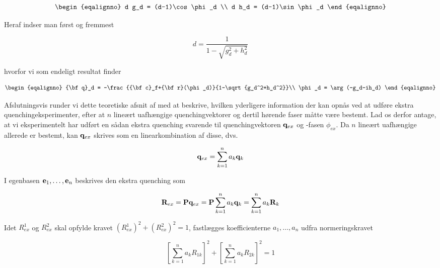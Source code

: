 \begin{subequations}
 \begin{eqalignno}
  d g_d = (d-1)\cos\phi_d \\
  d h_d = (d-1)\sin\phi_d 
 \end{eqalignno}
\end{subequations}

Heraf indser man f{\o}rst og fremmest

\begin{equation}
 d = \frac{1}{1-\sqrt{g_d^2+h_d^2}}
\end{equation}

hvorfor vi som endeligt resultat finder

\begin{subequations}
 \begin{eqalignno}
  {\bf q}_d = -\frac{{\bf c}_f+{\bf r}(\phi_d)}{1-\sqrt{g_d^2+h_d^2}}\\
  \phi_d    =  \arg (-g_d-ih_d)  
 \end{eqalignno}
 \label{eq:dilquench}
\end{subequations}

Afslutningsvis runder vi dette teoretiske afsnit af med at
beskrive, hvilken yderligere information der kan opn{\aa}s
ved at udf{\o}re ekstra quenching\-eks\-peri\-menter, efter
at $n$ line{\ae}rt uafh{\ae}ngige quenchingvektorer og
dertil h{\o}r\-ende faser m{\aa}tte v{\ae}re bestemt. Lad
os derfor antage, at vi eksperimentelt har udf{\o}rt en
s{\aa}dan ekstra quenching svarende til quenchingvektoren
${\bf q}_{ex}$ og -fasen $\phi_{ex}$. Da $n$ line{\ae}rt
uafh{\ae}ngige allerede er bestemt, kan ${\bf q}_{ex}$
skrives som en linearkombination af disse, dvs.

\begin{equation}
 {\bf q}_{ex} = \sum_{k=1}^n a_k{\bf q}_k
\end{equation}

I egenbasen ${\bf e}_1,\ldots,{\bf e}_n$ beskrives
den ekstra quenching som 

\begin{equation}
 {\bf R}_{ex} = 
 {\bf P}{\bf q}_{ex} = 
 {\bf P}\sum_{k=1}^n a_k{\bf q}_k =
 \sum_{k=1}^n a_k{\bf R}_k
\end{equation}

Idet $R_{ex}^1$ og $R_{ex}^2$ skal opfylde kravet
$(R_{ex}^1)^2+(R_{ex}^2)^2 = 1$, fastl{\ae}gges
koefficienterne $a_1,\ldots,a_n$ udfra normeringskravet

\begin{equation}
 \left[ \sum_{k=1}^n a_k R_{1k} \right]^2 +
 \left[ \sum_{k=1}^n a_k R_{2k} \right]^2 = 1
\end{equation}


